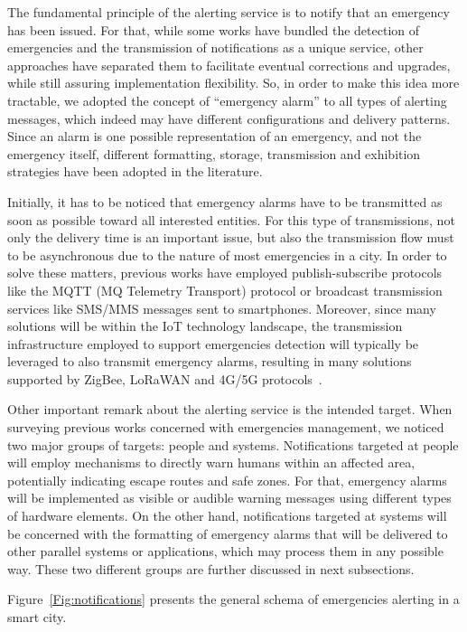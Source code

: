 \begin{refsection}
The fundamental principle of the alerting service is to notify that an emergency has been issued. For that, while some works have bundled the detection of emergencies and the transmission of notifications as a unique service, other approaches have separated them to facilitate eventual corrections and upgrades, while still assuring implementation flexibility. So, in order to make this idea more tractable, we adopted the concept of ``emergency alarm'' to all types of alerting messages, which indeed may have different configurations and delivery patterns. Since an alarm is one possible representation of an emergency, and not the emergency itself, different formatting, storage, transmission and exhibition strategies have been adopted in the literature.

Initially, it has to be noticed that emergency alarms have to be transmitted as soon as possible toward all interested entities. For this type of transmissions, not only the delivery time is an important issue, but also the transmission flow must to be asynchronous due to the nature of most emergencies in a city. In order to solve these matters, previous works have employed publish-subscribe protocols like the MQTT (MQ Telemetry Transport) protocol or broadcast transmission services like SMS/MMS messages sent to smartphones. Moreover, since many solutions will be within the IoT technology landscape, the transmission infrastructure employed to support emergencies detection will typically be leveraged to also transmit emergency alarms, resulting in many solutions supported by ZigBee, LoRaWAN and 4G/5G protocols~\cite{protocolsiot1,protocolsiot2}.

Other important remark about the alerting service is the intended target. When surveying previous works concerned with emergencies management, we noticed two major groups of targets: people and systems. Notifications targeted at people will employ mechanisms to directly warn humans within an affected area, potentially indicating escape routes and safe zones. For that, emergency alarms will be implemented as visible or audible warning messages using different types of hardware elements. On the other hand, notifications targeted at systems will be concerned with the formatting of emergency alarms that will be delivered to other parallel systems or applications, which may process them in any possible way. These two different groups are further discussed in next subsections.

Figure~\ref{Fig:notifications} presents the general schema of emergencies alerting in a smart city.


\end{refsection}
